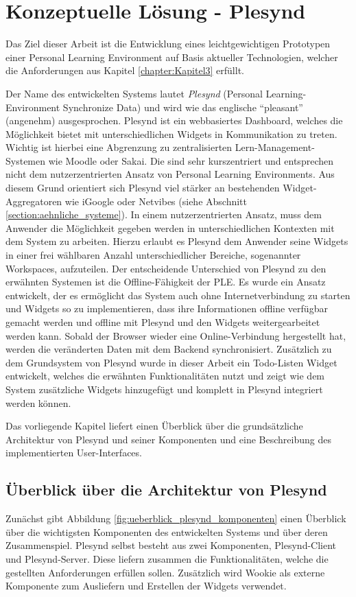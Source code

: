 \chapter{Konzeptuelle Lösung - Plesynd} 
\label{chapter:Kapitel5}
Das Ziel dieser Arbeit ist die Entwicklung eines leichtgewichtigen Prototypen einer Personal Learning Environment auf Basis aktueller Technologien, welcher die Anforderungen aus Kapitel \ref{chapter:Kapitel3} erfüllt. 

Der Name des entwickelten Systems lautet \emph{Plesynd} (Personal Learning-Environment Synchronize Data) und wird wie das englische "`pleasant"' (angenehm) ausgesprochen. Plesynd ist ein webbasiertes Dashboard, welches die Möglichkeit bietet mit unterschiedlichen Widgets in Kommunikation zu treten. Wichtig ist hierbei eine Abgrenzung zu zentralisierten Lern-Management-Systemen wie Moodle oder Sakai. Die sind sehr kurszentriert und entsprechen nicht dem nutzerzentrierten Ansatz von Personal Learning Environments. Aus diesem Grund orientiert sich Plesynd viel stärker an bestehenden Widget-Aggregatoren wie iGoogle oder Netvibes (siehe Abschnitt \ref{section:aehnliche_systeme}). In einem nutzerzentrierten Ansatz, muss dem Anwender die Möglichkeit gegeben werden in unterschiedlichen Kontexten mit dem System zu arbeiten. Hierzu erlaubt es Plesynd dem Anwender seine Widgets in einer frei wählbaren Anzahl unterschiedlicher Bereiche, sogenannter Workspaces, aufzuteilen. Der entscheidende Unterschied von Plesynd zu den erwähnten Systemen ist die Offline-Fähigkeit der PLE. Es wurde ein Ansatz entwickelt, der es ermöglicht das System auch ohne Internetverbindung zu starten und Widgets so zu implementieren, dass ihre Informationen offline verfügbar gemacht werden und offline mit Plesynd und den Widgets weitergearbeitet werden kann. Sobald der Browser wieder eine Online-Verbindung hergestellt hat, werden die veränderten Daten mit dem Backend synchronisiert. Zusätzlich zu dem Grundsystem von Plesynd wurde in dieser Arbeit ein Todo-Listen Widget entwickelt, welches die erwähnten Funktionalitäten nutzt und zeigt wie dem System zusätzliche Widgets hinzugefügt und komplett in Plesynd integriert werden können.

Das vorliegende Kapitel liefert einen Überblick über die grundsätzliche Architektur von Plesynd und seiner Komponenten und eine Beschreibung des implementierten User-Interfaces.

\section{Überblick über die Architektur von Plesynd}\label{section:plesynd_architektur}
Zunächst gibt Abbildung \ref{fig:ueberblick_plesynd_komponenten} einen Überblick über die wichtigsten Komponenten des entwickelten Systems und über deren Zusammenspiel. Plesynd selbst besteht aus zwei Komponenten, Plesynd-Client und Plesynd-Server. Diese liefern zusammen die Funktionalitäten, welche die gestellten Anforderungen erfüllen sollen. Zusätzlich wird Wookie als externe Komponente zum Ausliefern und Erstellen der Widgets verwendet.

